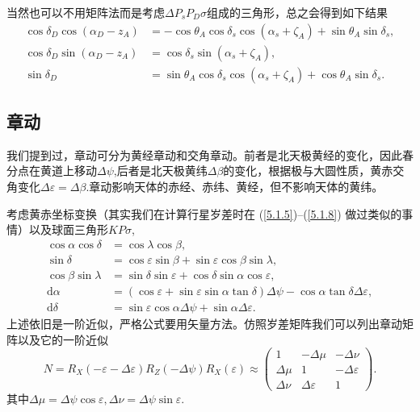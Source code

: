 \documentclass[11pt, a4paper, oneside]{ctexart}
\numberwithin{equation}{subsection}
\begin{document}
当然也可以不用矩阵法而是考虑$\Delta{}P_{s}P_{D}\sigma$组成的三角形，总之会得到如下结果
\begin{align}
\cos\delta_D\cos\left(\alpha_D-z_A\right)&=-\cos\theta_A\cos\delta_s\cos\left(\alpha_s+\zeta_A\right)+\sin\theta_A\sin\delta_s,\\
\cos\delta_D\sin\left(\alpha_D-z_A\right)&=\cos\delta_s\sin\left(\alpha_s+\zeta_A\right),\\
\sin\delta_D&=\sin\theta_A\cos\delta_s\cos\left(\alpha_s+\zeta_A\right)+\cos\theta_A\sin\delta_s.
\end{align}

\subsection{章动}
我们提到过，章动可分为黄经章动和交角章动。前者是北天极黄经的变化，因此春分点在黄道上移动$\Delta{}\psi$,后者是北天极黄纬$\Delta{}\beta$的变化，根据极与大圆性质，黄赤交角变化$\Delta{}\varepsilon=\Delta{}\beta$.章动影响天体的赤经、赤纬、黄经，但不影响天体的黄纬。

考虑黄赤坐标变换（其实我们在计算行星岁差时在 (\ref{5.1.5})--(\ref{5.1.8}) 做过类似的事情）以及球面三角形$KP\sigma$,
\begin{align}
\cos\alpha\cos\delta&=\cos\lambda\cos\beta,\\
\sin\delta&=\cos\varepsilon\sin\beta+\sin\varepsilon\cos\beta\sin\lambda,\\
\cos\beta\sin\lambda&=\sin\delta\sin\varepsilon+\cos\delta\sin\alpha\cos\varepsilon,\\
\mathrm{d}\alpha&=\left(\cos\varepsilon+\sin\varepsilon\sin\alpha\tan\delta\right)\Delta\psi-\cos\alpha\tan\delta\Delta\varepsilon,\\
\mathrm{d}\delta&=\sin\varepsilon\cos\alpha\Delta\psi+\sin\alpha\Delta\varepsilon.
\end{align}
上述依旧是一阶近似，严格公式要用矢量方法。仿照岁差矩阵我们可以列出章动矩阵以及它的一阶近似
\begin{equation}
N=R_X\left(-\varepsilon-\Delta\varepsilon\right)R_Z\left(-\Delta\psi\right)R_X\left(\varepsilon\right)\approx\begin{pmatrix}
1 & -\Delta{}\mu & -\Delta{}\nu\\
\Delta{}\mu & 1 & -\Delta{}\varepsilon\\
\Delta{}\nu & \Delta{}\varepsilon & 1
\end{pmatrix}.
\end{equation}
其中$\Delta{}\mu=\Delta{}\psi\cos\varepsilon,\Delta{}\nu=\Delta{}\psi\sin\varepsilon$.
\end{document}
